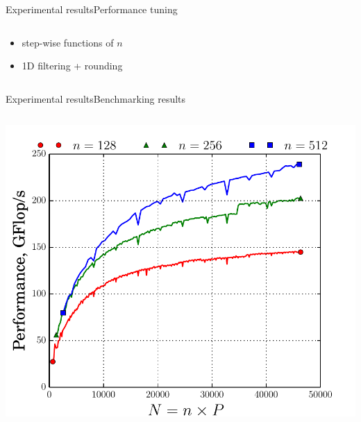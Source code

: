 \documentclass[xcolor=table,final]{beamer} %
\begin{document}
\begin{frame}{Experimental results}{Performance tuning}
\begin{columns}
\begin{column}[t]{0.5\textwidth}
      \begin{itemize}
        \small
      \item %
        step-wise functions of $n$
      \item 1D filtering + rounding
      \end{itemize}
    \end{column}

  \end{columns}
\end{frame}

\begin{frame}{Experimental results}{Benchmarking results}
\begin{columns}[t]%
  \begin{column}[t]{0.5\textwidth}
    \centering
    \includegraphics[width=\textwidth]{./figs/pdf/BSOFI_performance_scale}


\end{column}
\end{columns}
\end{frame}
\end{document}

